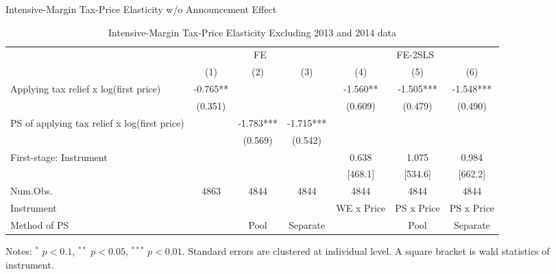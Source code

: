 \documentclass[
  ignorenonframetext,
  aspectratio=169,
]{beamer}
\begin{document}
\begin{frame}{Intensive-Margin Tax-Price Elasticity w/o Announcement Effect}
\protect\hypertarget{intensive-margin-tax-price-elasticity-wo-announcement-effect}{}
\begin{table}

\caption{\label{tab:WoAnnoucementIntensive}Intensive-Margin Tax-Price Elasticity Excluding 2013 and 2014 data}
\centering
\fontsize{7}{9}\selectfont
\begin{threeparttable}
\begin{tabular}[t]{lcccccc}
\toprule
\multicolumn{1}{c}{ } & \multicolumn{3}{c}{FE} & \multicolumn{3}{c}{FE-2SLS} \\
\cmidrule(l{3pt}r{3pt}){2-4} \cmidrule(l{3pt}r{3pt}){5-7}
  & (1) & (2) & (3) & (4) & (5) & (6)\\
\midrule
Applying tax relief x log(first price) & -0.765** &  &  & -1.560** & -1.505*** & -1.548***\\
 & (0.351) &  &  & (0.609) & (0.479) & (0.490)\\
PS of applying tax relief x log(first price) &  & -1.783*** & -1.715*** &  &  & \\
 &  & (0.569) & (0.542) &  &  & \\
\midrule
First-stage: Instrument &  &  &  & 0.638 & 1.075 & 0.984\\
 &  &  &  & [468.1] & [534.6] & [662.2]\\
Num.Obs. & 4863 & 4844 & 4844 & 4844 & 4844 & 4844\\
Instrument &  &  &  & WE x Price & PS x Price & PS x Price\\
Method of PS &  & Pool & Separate &  & Pool & Separate\\
\bottomrule
\end{tabular}
\begin{tablenotes}
\item Notes: $^{*}$ $p < 0.1$, $^{**}$ $p < 0.05$, $^{***}$ $p < 0.01$. Standard errors are clustered at individual level. A square bracket is wald statistics of instrument.
\end{tablenotes}
\end{threeparttable}
\end{table}
\end{frame}
\end{document}

